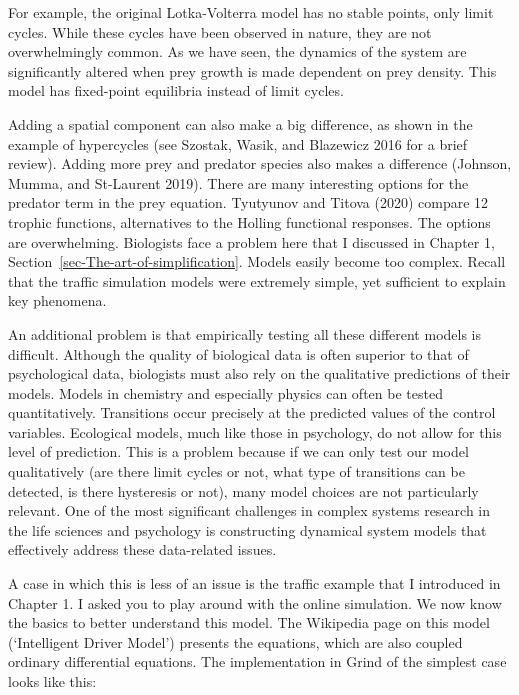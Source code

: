 \documentclass[
  a4paper,
  DIV=11,
  numbers=noendperiod,
  oneside]{scrreprt}
\begin{document}
For example, the original Lotka-Volterra model has no stable points,
only limit cycles. While these cycles have been observed in nature, they
are not overwhelmingly common. As we have seen, the dynamics of the
system are significantly altered when prey growth is made dependent on
prey density. This model has fixed-point equilibria instead of limit
cycles.

Adding a spatial component can also make a big difference, as shown in
the example of hypercycles (see Szostak, Wasik, and Blazewicz 2016 for a
brief review). Adding more prey and predator species also makes a
difference (Johnson, Mumma, and St-Laurent 2019). There are many
interesting options for the predator term in the prey equation.
Tyutyunov and Titova (2020) compare 12 trophic functions, alternatives
to the Holling functional responses. The options are overwhelming.
Biologists face a problem here that I discussed in Chapter 1,
Section~\ref{sec-The-art-of-simplification}. Models easily become too
complex. Recall that the traffic simulation models were extremely
simple, yet sufficient to explain key phenomena.

An additional problem is that empirically testing all these different
models is difficult. Although the quality of biological data is often
superior to that of psychological data, biologists must also rely on the
qualitative predictions of their models. Models in chemistry and
especially physics can often be tested quantitatively. Transitions occur
precisely at the predicted values of the control variables. Ecological
models, much like those in psychology, do not allow for this level of
prediction. This is a problem because if we can only test our model
qualitatively (are there limit cycles or not, what type of transitions
can be detected, is there hysteresis or not), many model choices are not
particularly relevant. One of the most significant challenges in complex
systems research in the life sciences and psychology is constructing
dynamical system models that effectively address these data-related
issues.

A case in which this is less of an issue is the traffic example that I
introduced in Chapter 1. I asked you to play around with the online
simulation. We now know the basics to better understand this model. The
Wikipedia page on this model (`Intelligent Driver Model') presents the
equations, which are also coupled ordinary differential equations. The
implementation in Grind of the simplest case looks like this:
\end{document}
